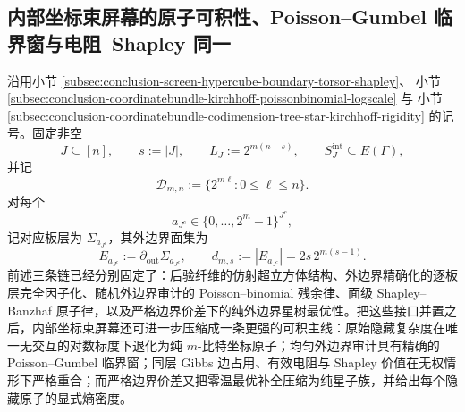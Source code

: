 \subsection{内部坐标束屏幕的原子可积性、Poisson--Gumbel 临界窗与电阻--Shapley 同一}\label{subsec:conclusion-coordinatebundle-integrable-poisson-gumbel-resistance-shapley}

沿用小节 \ref{subsec:conclusion-screen-hypercube-boundary-torsor-shapley}、
小节 \ref{subsec:conclusion-coordinatebundle-kirchhoff-poissonbinomial-logscale} 与
小节 \ref{subsec:conclusion-coordinatebundle-codimension-tree-star-kirchhoff-rigidity}
的记号。固定非空
\[
J\subseteq [n],
\qquad
s:=|J|,
\qquad
L_J:=2^{m(n-s)},
\qquad
S_J^{\mathrm{int}}\subseteq E(\Gamma),
\]
并记
\[
\mathcal D_{m,n}:=\{2^{m\ell}:0\le \ell\le n\}.
\]
对每个
\[
a_{J^c}\in\{0,\dots,2^m-1\}^{J^c},
\]
记对应板层为 \(\Sigma_{a_{J^c}}\)，其外边界面集为
\[
E_{a_{J^c}}:=\partial_{\mathrm{out}}\Sigma_{a_{J^c}},
\qquad
d_{m,s}:=|E_{a_{J^c}}|=2s\,2^{m(s-1)}.
\]
前述三条链已经分别固定了：后验纤维的仿射超立方体结构、外边界精确化的逐板层完全因子化、随机外边界审计的 Poisson--binomial 残余律、面级 Shapley--Banzhaf 原子律，以及严格边界价差下的纯外边界星树最优性。把这些接口并置之后，内部坐标束屏幕还可进一步压缩成一条更强的可积主线：原始隐藏复杂度在唯一无交互的对数标度下退化为纯 \(m\)-比特坐标原子；均匀外边界审计具有精确的 Poisson--Gumbel 临界窗；同层 Gibbs 边占用、有效电阻与 Shapley 价值在无权情形下严格重合；而严格边界价差又把零温最优补全压缩为纯星子族，并给出每个隐藏原子的显式熵密度。

